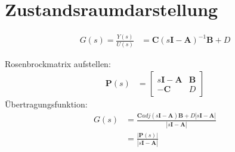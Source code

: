 \setcounter{section}{9}
\section{Zustandsraumdarstellung}

\begin{tcolorbox}[colback=white!10!white,colframe=blue!70!black,title=Übertragungsfunktion aus Zustandsraumdarstellung]
    \begin{tcolorbox}[colback=white!10!white,colframe=gray!70!black,title=Matrixinversion]
        
        \begin{align*}
            G(s) = \frac{Y(s)}{U(s)} &= \boldsymbol{C}(s\boldsymbol{I}-\boldsymbol{A})^{-1}\boldsymbol{B}+D
        \end{align*}
    \end{tcolorbox}
    
    \begin{tcolorbox}[colback=white!10!white,colframe=gray!70!black,title=Verallgemeinerte Systemmatrix]
            Rosenbrockmatrix aufstellen:
            \begin{align*}
                \boldsymbol{P}(s) &= 
            \left[\begin{array}{c|c}
            s\boldsymbol{I}-\boldsymbol{A} & \boldsymbol{B} \\\hline
            -\boldsymbol{C} & D 
            \end{array}\right]    
            \end{align*}
        Übertragungsfunktion:
        \begin{align*}
            G(s) &= \frac{\boldsymbol{C} adj(s\boldsymbol{I}-\boldsymbol{A})\boldsymbol{B}+D|s\boldsymbol{I}-\boldsymbol{A}|}{|s\boldsymbol{I}-\boldsymbol{A}|}\\
            &= \frac{|\boldsymbol{P}(s)|}{|s\boldsymbol{I}-\boldsymbol{A}|}
        \end{align*}
            
    \end{tcolorbox}
    
\end{tcolorbox}
